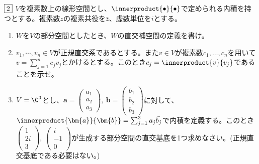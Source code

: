 \begin{tcolorbox} %
	$\fbox{2}$ $V$を複素数上の線形空間とし、$\innerproduct{\bullet}{\bullet}$で定められる内積を持つとする。複素数$z$の複素共役を$\bar{z}$、虚数単位を$i$とする。

\begin{enumerate}
	\item $W$を$V$の部分空間としたとき、$W$の直交補空間の定義を書け。
	\item $v_1, \cdots, v_n\in V$が正規直交系であるとする。また$v\in V$が複素数$c_1, \ldots, c_n$を用いて$v= \sum_{j= 1}^n c_j v_j$とかけるとする。このとき$c_j= \innerproduct{v}{v_j}$であることを示せ。
	\item $V= \C^3$とし、$\bm{a}= \begin{pmatrix}a_1\\ a_2\\ a_3\end{pmatrix},\ \bm{b}= \begin{pmatrix}b_1\\ b_2\\ b_3\end{pmatrix}$に対して、$\innerproduct{\bm{a}}{\bm{b}}= \sum_{j= 1}^3 a_j\bar{b_j}$で内積を定義する。このとき$\begin{pmatrix}1\\ 2i\\ 3\end{pmatrix},\ \begin{pmatrix}i\\ -1\\ 0\end{pmatrix}$が生成する部分空間の直交基底を1つ求めなさい。(正規直交基底である必要はない。)
\end{enumerate}
\end{tcolorbox}

